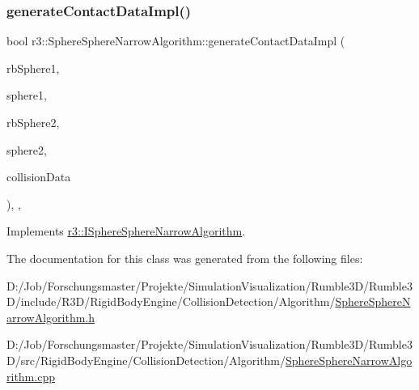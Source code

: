 \subsubsection{\texorpdfstring{generate\+Contact\+Data\+Impl()}{generateContactDataImpl()}}
{\footnotesize\ttfamily bool r3\+::\+Sphere\+Sphere\+Narrow\+Algorithm\+::generate\+Contact\+Data\+Impl (\begin{DoxyParamCaption}\item[{\mbox{\hyperlink{classr3_1_1_rigid_body}{Rigid\+Body}} $\ast$}]{rb\+Sphere1,  }\item[{\mbox{\hyperlink{classr3_1_1_collision_sphere}{Collision\+Sphere}} $\ast$}]{sphere1,  }\item[{\mbox{\hyperlink{classr3_1_1_rigid_body}{Rigid\+Body}} $\ast$}]{rb\+Sphere2,  }\item[{\mbox{\hyperlink{classr3_1_1_collision_sphere}{Collision\+Sphere}} $\ast$}]{sphere2,  }\item[{\mbox{\hyperlink{classr3_1_1_collision_data}{Collision\+Data}} \&}]{collision\+Data }\end{DoxyParamCaption})\hspace{0.3cm}{\ttfamily [override]}, {\ttfamily [protected]}, {\ttfamily [virtual]}}



Implements \mbox{\hyperlink{classr3_1_1_i_sphere_sphere_narrow_algorithm_a9e616d04c7ee379d973ec81ea0067cc3}{r3\+::\+I\+Sphere\+Sphere\+Narrow\+Algorithm}}.



The documentation for this class was generated from the following files\+:\begin{DoxyCompactItemize}
\item 
D\+:/\+Job/\+Forschungsmaster/\+Projekte/\+Simulation\+Visualization/\+Rumble3\+D/\+Rumble3\+D/include/\+R3\+D/\+Rigid\+Body\+Engine/\+Collision\+Detection/\+Algorithm/\mbox{\hyperlink{_sphere_sphere_narrow_algorithm_8h}{Sphere\+Sphere\+Narrow\+Algorithm.\+h}}\item 
D\+:/\+Job/\+Forschungsmaster/\+Projekte/\+Simulation\+Visualization/\+Rumble3\+D/\+Rumble3\+D/src/\+Rigid\+Body\+Engine/\+Collision\+Detection/\+Algorithm/\mbox{\hyperlink{_sphere_sphere_narrow_algorithm_8cpp}{Sphere\+Sphere\+Narrow\+Algorithm.\+cpp}}\end{DoxyCompactItemize}
